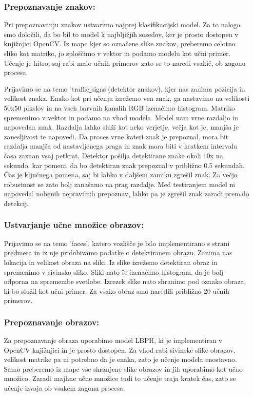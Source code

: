 \documentclass{llncs}
\begin{document}
\subsubsection{Prepoznavanje znakov:}
Pri prepoznavanju znakov ustvarimo najprej klasifikacijski model. Za to nalogo smo določili, da bo bil to model k najbljižjih sosedov, ker je prosto dostopen v knjižnjici OpenCV. Iz mape kjer so označene slike znakov, preberemo celotno sliko kot matriko, jo sploščimo v vektor in podamo modelu kot učni primer. Učenje je hitro, saj rabi malo učnih primerov zato se to naredi vsakič, ob zagonu procesa. 

Prijavimo se na temo 'traffic\underline{ }signs'(detektor znakov), kjer nas zanima pozicija in velikost znaka. Enako kot pri učenju izrežemo ven znak, ga nastavimo na velikosti 50x50 pikslov in na vseh barvnih kanalih RGB izenačimo histogram. Matriko spremenimo v vektor in podamo na vhod modela. Model nam vrne razdaljo in napovedan znak. Razdalja lahko služi kot neko verjetje, večja kot je, manjša je zanesljivost te napovedi. Da proces vrne kateri znak je prepoznal, mora bit razdalja manjša od nastavljenega praga in znak mora biti v kratkem intervalu časa zaznan vsaj petkrat. Detektor pošilja detektirane znake okoli 10x na sekundo, kar pomeni, da bo detektiran znak prepoznal v približno 0.5 sekundah. Čas je ključnega pomena, saj bi lahko v daljšem zamiku zgrešil znak. Za večjo robustnost se zato bolj zanašamo na prag razdalje. Med testiranjem model ni napovedal nobenih nepravilnih prepoznav, lahko pa je zgrešil znak zaradi premalo detekcij. 

\subsubsection{Ustvarjanje učne množice obrazov:}
Prijavimo se na temo 'faces', katero vozlišče je bilo implementirano s strani predmeta in iz nje pridobivamo podatke o detektiranem obrazu. Zanima nas lokacija in velikost obraza na sliki. Iz slike izrežemo detektiran obraz in spremenimo v sivinsko sliko. Sliki nato še izenačimo histogram, da je bolj odporna na spremembe svetlobe. Izrezek slike nato shranimo pod oznako obraza, ki bo služil kot učni primer. Za vsako obraz smo naredili približno 20 učnih primerov. 

\subsubsection{Prepoznavanje obrazov:}
Za prepoznavanje obraza uporabimo model LBPH, ki je implementiran v OpenCV knjižnjici in je prosto dostopen. Za vhod rabi sivinske slike obrazov, velikost matrike pa ni potrebno da je enaka, zato je učenje modela enostavno. Samo preberemo iz mape vse shranjene slike obrazov in jih uporabimo kot učno množico. Zaradi majhne učne množice tudi to učenje traja kratek čas, zato se učenje izvaja ob vsakem zagonu procesa.
\end{document}
